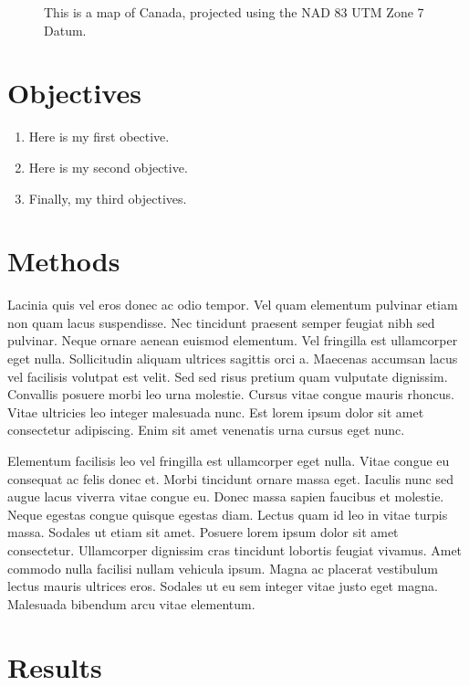 \documentclass[article,30pt,extrafontsizes]{memoir}
\begin{document}
\begin{multicols*}{3}
{\begin{figure}
{}

\caption{This is a map of Canada, projected using the NAD 83 UTM Zone 7 Datum.}\label{fig:unnamed-chunk-2}
\end{figure}

\section{Objectives}\label{objectives}

\begin{enumerate}
\def\labelenumi{\arabic{enumi}.}
\tightlist
\item
  Here is my first obective.
\item
  Here is my second objective.
\item
  Finally, my third objectives.
\end{enumerate}

\section{Methods}\label{methods}

Lacinia quis vel eros donec ac odio tempor. Vel quam elementum pulvinar
etiam non quam lacus suspendisse. Nec tincidunt praesent semper feugiat
nibh sed pulvinar. Neque ornare aenean euismod elementum. Vel fringilla
est ullamcorper eget nulla. Sollicitudin aliquam ultrices sagittis orci
a. Maecenas accumsan lacus vel facilisis volutpat est velit. Sed sed
risus pretium quam vulputate dignissim. Convallis posuere morbi leo urna
molestie. Cursus vitae congue mauris rhoncus. Vitae ultricies leo
integer malesuada nunc. Est lorem ipsum dolor sit amet consectetur
adipiscing. Enim sit amet venenatis urna cursus eget nunc.

Elementum facilisis leo vel fringilla est ullamcorper eget nulla. Vitae
congue eu consequat ac felis donec et. Morbi tincidunt ornare massa
eget. Iaculis nunc sed augue lacus viverra vitae congue eu. Donec massa
sapien faucibus et molestie. Neque egestas congue quisque egestas diam.
Lectus quam id leo in vitae turpis massa. Sodales ut etiam sit amet.
Posuere lorem ipsum dolor sit amet consectetur. Ullamcorper dignissim
cras tincidunt lobortis feugiat vivamus. Amet commodo nulla facilisi
nullam vehicula ipsum. Magna ac placerat vestibulum lectus mauris
ultrices eros. Sodales ut eu sem integer vitae justo eget magna.
Malesuada bibendum arcu vitae elementum.

\section{Results}\label{results}

}
\end{multicols*}
\end{document}
